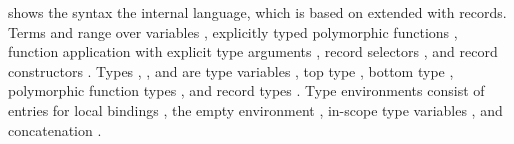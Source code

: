  shows the syntax
the internal language, which is based on \ltiFsub
extended with records.
Terms \ltiE{} and \ltiF{} range over 
variables \ltivar{},
explicitly typed polymorphic functions
\ltifunmono{\ltivar{}}{\ltiT{}}{\ltiE{}},
function application
with explicit type arguments
\ltiappinst{\ltiF{}}{\ova{\ltiT{}}}{\ltiE{}},
record selectors
\ltisel{\ltiE{}}{\ltivar{}},
and record constructors
.
Types \ltiT{}, \ltiS{}, and \ltiR{} are 
type variables \ltitvar{},
top type \ltiTop,
bottom type \ltiBot,
polymorphic function types \ltiArrow{\ltiT{}}{\ova{\ltitvar{}}}{\ltiS{}},
and record types .
Type environments \ltiEnv{}
consist of 
entries for local bindings
\hastype{\ltivar{}}{\ltiT{}},
the empty environment
\ltiEmptyEnv{},
in-scope type variables 
\ltitvar{},
and concatenation
\ltiEnvConcat{\ltiEnv{}}{\ltiEnvp{}}.


